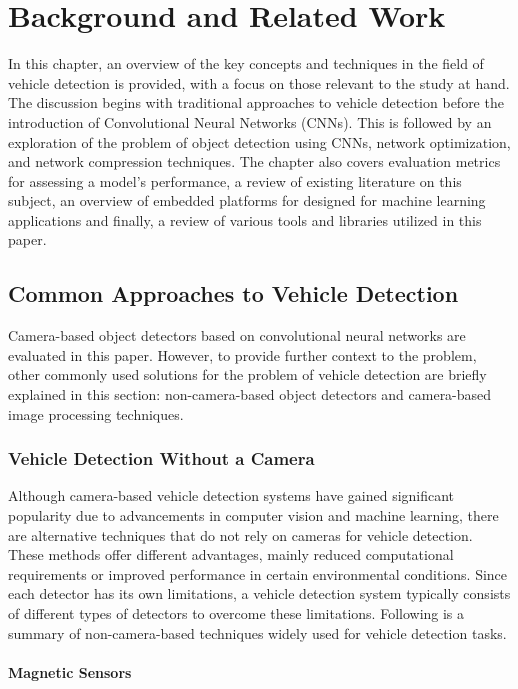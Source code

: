 \chapter{Background and Related Work}
\label{BackgroundAndRelatedWork}


In this chapter, an overview of the key concepts and techniques in the field of
vehicle detection is provided, with a focus on those relevant to the study at
hand. The discussion begins with traditional approaches to vehicle detection
before the introduction of Convolutional Neural Networks (CNNs). This is
followed by an exploration of the problem of object detection using CNNs,
network optimization, and network compression techniques. The chapter also
covers evaluation metrics for assessing a model's performance, a review of
existing literature on this subject, an overview of embedded platforms for
designed for machine learning applications and finally, a review of various
tools and libraries utilized in this paper.

\section{Common Approaches to Vehicle Detection}

Camera-based object detectors based on convolutional neural networks are
evaluated in this paper. However, to provide further context to the problem,
other commonly used solutions for the problem of vehicle detection are briefly
explained in this section: non-camera-based object detectors and
camera-based image processing techniques.


\subsection{Vehicle Detection Without a Camera}

Although camera-based vehicle detection systems have gained significant
popularity due to advancements in computer vision and machine learning, there
are alternative techniques that do not rely on cameras for vehicle detection.
These methods offer different advantages, mainly reduced computational
requirements or improved performance in certain environmental conditions. Since
each detector has its own limitations, a vehicle detection system typically
consists of different types of detectors to overcome these limitations.
Following is a summary of non-camera-based techniques widely used for vehicle
detection tasks.


\subsubsection*{Magnetic Sensors}

